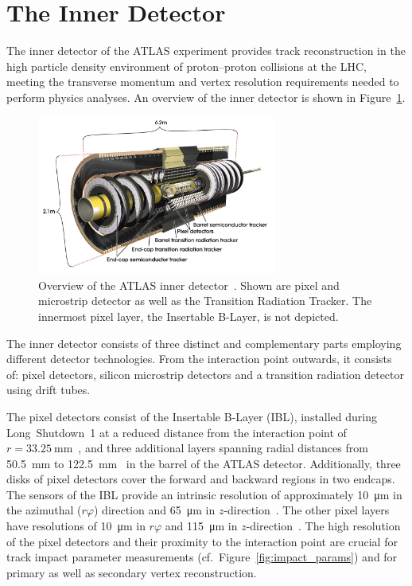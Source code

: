 \section{The Inner Detector}
\label{sec:atlas_tracking}

The inner detector of the ATLAS experiment provides track reconstruction in the
high particle density environment of proton--proton collisions at the LHC,
meeting the transverse momentum and vertex resolution requirements needed to
perform physics analyses. An overview of the inner detector is shown in
Figure~\ref{fig:atlas_indet}.

\begin{figure}[htb]
  \centering
  \includegraphics[width=0.7\textwidth]{./figures/atlas/inner_detector.jpg}
  \caption[Overview of the inner detector]{Overview of the ATLAS inner
    detector~\cite{indet_fig}. Shown are pixel and microstrip detector as well
    as the Transition Radiation Tracker. The innermost pixel layer, the
    Insertable B-Layer, is not depicted.}
  \label{fig:atlas_indet}
\end{figure}

The inner detector consists of three distinct and complementary parts employing
different detector technologies. From the interaction point outwards, it
consists of: pixel detectors, silicon microstrip detectors and a transition
radiation detector using drift tubes.

The pixel detectors consist of the Insertable B-Layer (IBL), installed during
Long~Shutdown~1 at a reduced distance from the interaction point
of~$r = \SI{33.25}{\milli\metre}$~\cite{ibl_tdr}, and three additional layers
spanning radial distances from \SI{50.5}{\milli\metre} to
\SI{122.5}{\milli\metre}~\cite{atlas_detector} in the barrel of the ATLAS
detector. Additionally, three disks of pixel detectors cover the forward and
backward regions in two endcaps. The sensors of the IBL provide an intrinsic
resolution of approximately \SI{10}{\micro\metre} in the azimuthal ($r\varphi$)
direction and \SI{65}{\micro\metre} in $z$-direction~\cite{ibl_measurement}. The
other pixel layers have resolutions of \SI{10}{\micro\metre} in $r\varphi$ and
\SI{115}{\micro\metre} in $z$-direction~\cite{atlas_detector}. The high
resolution of the pixel detectors and their proximity to the interaction point
are crucial for track impact parameter measurements (cf.\
Figure~\ref{fig:impact_params}) and for primary as well as secondary vertex
reconstruction.

